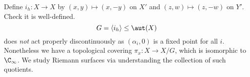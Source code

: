 \documentclass[a4paper]{article}
\begin{document}
Define \(i_h: X \to X\) by \((x, y) \mapsto (x, -y)\) on \(X'\) and \((z, w) \mapsto(z, -w)\) on \(Y'\). Check it is well-defined.
\[
  G = \langle i_h \rangle \leq \aut(X)
\]
does \emph{not} act properly discontinuously as \((\alpha_i, 0)\) is a fixed point for all \(i\). Nonetheless we have a topological covering \(\pi_x: X \to X/G\), which is isomorphic to \(\C_\infty\). We study Riemann surfaces via understanding the collection of such quotients.

\printindex
\end{document}
